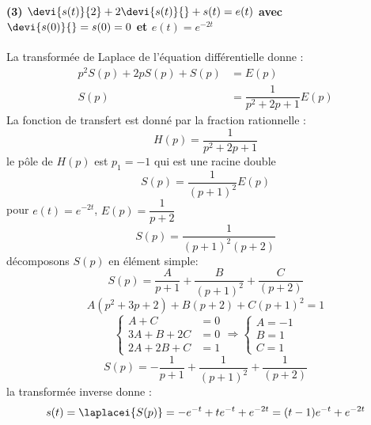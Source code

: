\paragraph{\textbf{(3) $\devi{s(t)}{2} + 2\devi{s(t)}{} + s(t)=e(t)$ 
avec $\devi{s(0)}{}=s(0)=0$ et $e(t) = e^{-2t}$}}
La transformée de Laplace de l'équation différentielle donne :
\begin{align*}
    p^2S(p)+2pS(p)+S(p)&=E(p) \\
    S(p)&=\dfrac{1}{p^2+2p+1}E(p)
\end{align*}
La fonction de transfert est donné par la fraction rationnelle :
$$
H(p)=\dfrac{1}{p^2+2p+1}
$$
le pôle de $H(p)$ est $p_1=-1$ qui est une racine double
$$
S(p) = \dfrac{1}{(p+1)^2}E(p)
$$
pour $e(t)=e^{-2t}$, $E(p)=\dfrac{1}{p+2}$
$$
S(p)=\dfrac{1}{(p+1)^2(p+2)}
$$
décomposons $S(p)$ en élément simple:
$$
S(p)=\dfrac{A}{p+1}+\dfrac{B}{(p+1)^2}+\dfrac{C}{(p+2)}
$$
$$
A(p^2+3p+2)+B(p+2)+C(p+1)^2=1
$$
$$
\begin{cases}
     A+C&=0 \\
    3A+B+2C&=0 \\
    2A+2B+C&=1
\end{cases}\Longrightarrow
\begin{cases}
    A=-1\\
    B=1\\
    C=1
\end{cases}
$$
$$
S(p)=-\dfrac{1}{p+1}+\dfrac{1}{(p+1)^2}+\dfrac{1}{(p+2)}
$$
la transformée inverse donne :
$$
s(t) = \laplacei{S(p)}= -e^{-t}+te^{-t}+e^{-2t} = (t-1)e^{-t}+e^{-2t}
$$
\begin{center}
\end{center}


